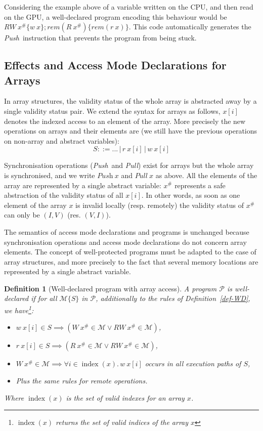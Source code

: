 \documentclass[preprint,12pt]{elsarticle}
\newcommand{\symb}[1]{\textit{#1}}
\newcommand{\Push}{\symb{Push}}
\newcommand{\Pull}{\symb{Pull}}
\newcommand{\rem}[1]{\symb{rem}(#1)}
\newtheorem{definition}{Definition}
\newcommand{\abs}[1]{#1^\#}
\newcommand{\AM}{\mathcal{M}}
\newcommand{\Prog}{\mathcal{P}}
\DeclareMathOperator{\range}{index}
\begin{document}
Considering the example above of a variable written on the CPU, and then read on the GPU, 
a well-declared program encoding this behaviour would be  $RW~\abs x\{w~x\};\rem{R~\abs 
x}\{\rem{r~x}\}$. This code automatically generates the \Push\ instruction that prevents 
the program from being stuck.
\subsection{Effects and Access Mode Declarations for Arrays}\label{sec-arrays}
In array structures, the 
validity status of the whole array is abstracted away by a single validity status pair. 
We extend the syntax for arrays as follows, $x[i]$ denotes the indexed access to an 
element of the array. More precisely the new operations on arrays and their elements are 
(we still have the previous operations on non-array and abstract variables):
\[S::= ... \,|\, r~x[i] \,|\, w~x[i] \]

Synchronisation operations (\Push\ and \Pull) exist for arrays but the whole array is 
synchronised, and we write $\Push~x$ and $\Pull~x$ as above.
All the elements of the array are represented by a single abstract variable: $\abs{x}$ 
represents a safe abstraction of the validity status of all $x[i]$. In other words, as soon as one element of the array $x$ is invalid locally (resp. remotely) the validity status of $\abs x$ can only be $(I,V)$ (res. $(V,I)$).

The semantics of access mode declarations and programs is unchanged because 
synchronisation operations and access mode declarations do not concern array elements.
The concept of well-protected programs must be adapted to the case of array structures, 
and more 
precisely to the fact that several  memory locations are represented by a single abstract 
variable.


\begin{definition}[Well-declared program with array access]\label{def:well-declared-array}
A program $\Prog$ is \emph{well-declared} if for all $\AM\{S\}$ in $\Prog$, additionally 
to the rules of Definition~\ref{def-WD}, we have\footnote{$\range(x)$ returns the set of valid indices of the array $x$}:
\begin{itemize}
\item $w\ x[i]\in S \implies (W\ \abs x \in \AM \lor RW\ \abs x \in \AM)$,
\item $r\ x[i]\in S \implies (R\ \abs x \in \AM \lor RW\ \abs x \in \AM)$,
\item $W\ \abs x\!\in\! \AM \!\implies\! \forall i\!\!\in\!\!\range(x).\, w\ x[i]$ occurs in all execution 
paths of $S$,
\item Plus the same rules for remote operations.
\end{itemize}
Where $\range(x)$ is the set of valid 
 indexes for an array $x$.
\end{definition}
\end{document}
